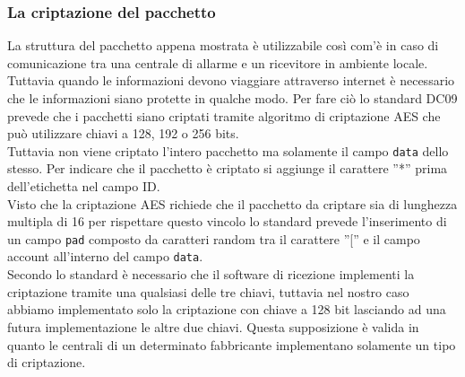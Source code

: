 \subsubsection{La criptazione del pacchetto}
La struttura del pacchetto appena mostrata è utilizzabile così com'è in caso di comunicazione tra una centrale di allarme e un ricevitore in ambiente locale. Tuttavia quando le informazioni devono viaggiare attraverso internet è necessario che le informazioni siano protette in qualche modo. Per fare ciò lo standard DC09 prevede che i pacchetti siano criptati tramite algoritmo di criptazione AES che può utilizzare chiavi a 128, 192 o 256 bits.\\
Tuttavia non viene criptato l'intero pacchetto ma solamente il campo \texttt{data} dello stesso. Per indicare che il pacchetto è criptato si aggiunge il carattere ''*'' prima dell'etichetta nel campo ID.\\
Visto che la criptazione AES richiede che il pacchetto da criptare sia di lunghezza multipla di 16 per rispettare questo vincolo lo standard prevede l'inserimento di un campo \texttt{pad} composto da caratteri random tra il carattere ''['' e il campo account all'interno del campo \texttt{data}.\\
Secondo lo standard è necessario che il software di ricezione implementi la criptazione tramite una qualsiasi delle tre chiavi, tuttavia nel nostro caso abbiamo implementato solo la criptazione con chiave a 128 bit lasciando ad una futura implementazione le altre due chiavi. Questa supposizione è valida in quanto le centrali di un determinato fabbricante implementano solamente un tipo di criptazione.
